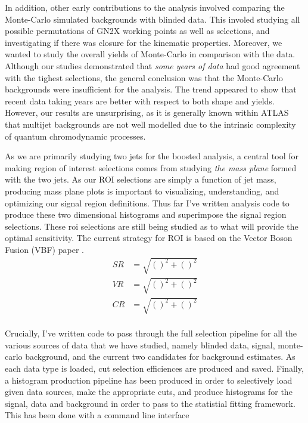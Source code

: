 \documentclass[12pt]{article}
\begin{document}
In addition, other early contributions to the analysis involved comparing the
Monte-Carlo simulated backgrounds with blinded data. This involed studying all
possible permutations of GN2X working points as well as selections, and
investigating if there was closure for the kinematic properties. Moreover, we
wanted to study the overall yields of Monte-Carlo in comparison with the data. Although our
studies demonstrated that \textit{some years of data} had good agreement with
the tighest selections, the general conclusion was that the Monte-Carlo
backgrounds were insufficient for the analysis. The trend appeared to show that
recent data taking years are better with respect to both shape and yields.
However, our results are unsurprising, as it is generally known within ATLAS
that multijet backgrounds are not well modelled due to the intrinsic
complexity of quantum chromodynamic processes.

As we are primarily studying two jets for the boosted analysis, a central tool
for making region of interest selections comes from studying \textit{the mass
plane} formed with the two jets. As our ROI selections are simply a function of
jet mass, producing mass plane plots is important to visualizing, understanding,
and optimizing our signal region definitions. Thus far I've written analysis
code to produce these two dimensional histograms and superimpose the signal
region selections. These roi selections are still being studied as to what will
provide the optimal sensitivity.
The current strategy for ROI is based on the Vector Boson Fusion (VBF) paper
\cite{vbf_hh4b}.
\begin{align}
    SR &= \sqrt{\left(  \right)^2 + \left(  \right)^2} \\
    VR &= \sqrt{\left(  \right)^2 + \left(  \right)^2} \\
    CR &= \sqrt{\left(  \right)^2 + \left(  \right)^2} \\
\end{align}

Crucially, I've written code to pass through the full selection pipeline for all
the various sources of data that we have studied, namely blinded data, signal,
monte-carlo background, and the current two candidates for background estimates.
As each data type is loaded, cut selection efficiences are produced and saved.
Finally, a histogram production pipeline has been produced in order to
selectively load given data sources, make the appropriate cuts, and produce
histograms for the signal, data and background in order to pass to the
statistial fitting framework. This has been done with a command line interface
\end{document}
